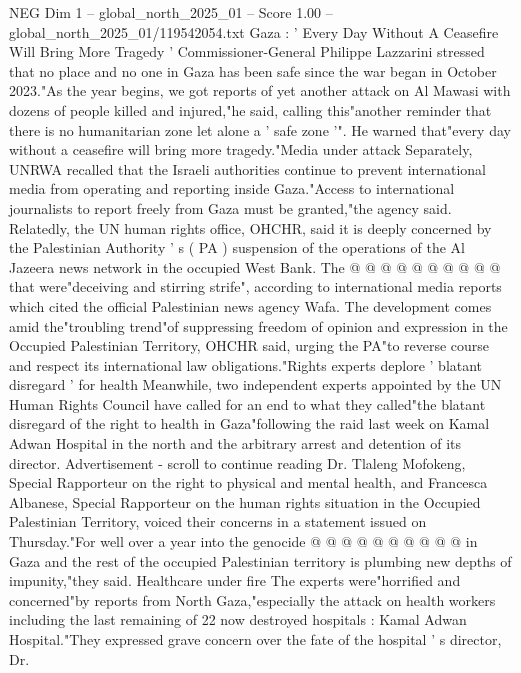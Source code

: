 \begin{textsample}{NEG Dim 1 – global\_north\_2025\_01 – Score 1.00 – global\_north\_2025\_01/119542054.txt}  \label{ex:f1_neg_058}
Gaza : ' Every Day Without A Ceasefire Will Bring More Tragedy ' Commissioner-General Philippe Lazzarini stressed that no place and no one in Gaza has been safe since the war began in October 2023."As the year begins, we got reports of yet another attack on Al Mawasi with dozens of people killed and injured,"he said, calling this"another reminder that there is no humanitarian zone let alone a ' safe zone '".
He warned that"every day without a ceasefire will bring more tragedy."Media under attack Separately, UNRWA recalled that the Israeli authorities continue to prevent international media from operating and reporting inside Gaza."Access to international journalists to report freely from Gaza must be granted,"the agency said.
Relatedly, the UN human rights office, OHCHR, said it is deeply concerned by the Palestinian Authority ' s ( PA ) suspension of the operations of the Al Jazeera news network in the occupied West Bank.
The @ @ @ @ @ @ @ @ @ @ that were"deceiving and stirring strife", according to international media reports which cited the official Palestinian news agency Wafa.
The development comes amid the"troubling trend"of suppressing freedom of opinion and expression in the Occupied Palestinian Territory, OHCHR said, urging the PA"to reverse course and respect its international law obligations."Rights experts deplore ' blatant disregard ' for health Meanwhile, two independent experts appointed by the UN Human Rights Council have called for an end to what they called"the blatant disregard of the right to health in Gaza"following the raid last week on Kamal Adwan Hospital in the north and the arbitrary arrest and detention of its director.
Advertisement - scroll to continue reading Dr.
Tlaleng Mofokeng, Special Rapporteur on the right to physical and mental health, and Francesca Albanese, Special Rapporteur on the human rights situation in the Occupied Palestinian Territory, voiced their concerns in a statement issued on Thursday."For well over a year into the genocide @ @ @ @ @ @ @ @ @ @ in Gaza and the rest of the occupied Palestinian territory is plumbing new depths of impunity,"they said.
Healthcare under fire The experts were"horrified and concerned"by reports from North Gaza,"especially the attack on health workers including the last remaining of 22 now destroyed hospitals : Kamal Adwan Hospital."They expressed grave concern over the fate of the hospital ' s director, Dr.

\end{textsample}
